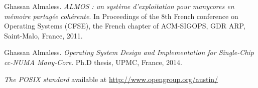\begin{thebibliography}{1}

   Ghassan Almaless. \emph{ALMOS : un système d'exploitation
    pour manycores en mémoire partagée cohérente}. \relax In Proceedings of the
    8th French conference on Operating Systems (CFSE), the French chapter of
    ACM-SIGOPS, GDR ARP, Saint-Malo, France, 2011.

   Ghassan Almaless. \emph{Operating System Design and
    Implementation for Single-Chip cc-NUMA Many-Core}. \relax Ph.D thesis, UPMC,
    France, 2014.

   \emph{The POSIX standard} available at
    \url{http://www.opengroup.org/austin/}


\end{thebibliography}
